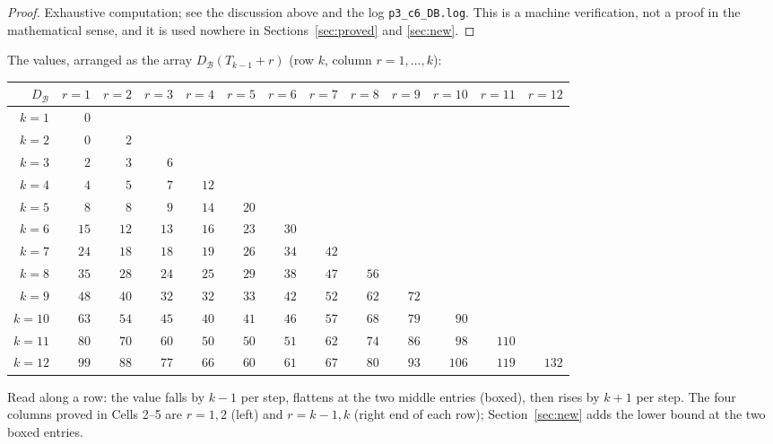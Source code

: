 \documentclass[11pt]{article}
\theoremstyle{definition}
\newcommand{\DB}{D_{\mathcal{B}}}
\begin{document}
\begin{proof}
Exhaustive computation; see the discussion above and the log \texttt{p3\_c6\_DB.log}.  This is a
machine verification, not a proof in the mathematical sense, and it is used nowhere in
Sections~\ref{sec:proved} and \ref{sec:new}.
\end{proof}

\noindent The values, arranged as the array $\DB(T_{k-1}+r)$ (row $k$, column $r=1,\dots,k$):

\begin{center}\small\setlength{\tabcolsep}{3pt}
\begin{tabular}{rrrrrrrrrrrrr}
\hline
$\DB$ & $r=1$ & $r=2$ & $r=3$ & $r=4$ & $r=5$ & $r=6$ & $r=7$ & $r=8$ & $r=9$ & $r=10$ & $r=11$ & $r=12$ \\
\hline
$k=1$ & $0$ &  &  &  &  &  &  &  &  &  &  &  \\
$k=2$ & $0$ & $2$ &  &  &  &  &  &  &  &  &  &  \\
$k=3$ & $\boxed{2}$ & $\boxed{3}$ & $6$ &  &  &  &  &  &  &  &  &  \\
$k=4$ & $\boxed{4}$ & $\boxed{5}$ & $7$ & $12$ &  &  &  &  &  &  &  &  \\
$k=5$ & $8$ & $\boxed{8}$ & $\boxed{9}$ & $14$ & $20$ &  &  &  &  &  &  &  \\
$k=6$ & $15$ & $\boxed{12}$ & $\boxed{13}$ & $16$ & $23$ & $30$ &  &  &  &  &  &  \\
$k=7$ & $24$ & $18$ & $\boxed{18}$ & $\boxed{19}$ & $26$ & $34$ & $42$ &  &  &  &  &  \\
$k=8$ & $35$ & $28$ & $\boxed{24}$ & $\boxed{25}$ & $29$ & $38$ & $47$ & $56$ &  &  &  &  \\
$k=9$ & $48$ & $40$ & $32$ & $\boxed{32}$ & $\boxed{33}$ & $42$ & $52$ & $62$ & $72$ &  &  &  \\
$k=10$ & $63$ & $54$ & $45$ & $\boxed{40}$ & $\boxed{41}$ & $46$ & $57$ & $68$ & $79$ & $90$ &  &  \\
$k=11$ & $80$ & $70$ & $60$ & $50$ & $\boxed{50}$ & $\boxed{51}$ & $62$ & $74$ & $86$ & $98$ & $110$ &  \\
$k=12$ & $99$ & $88$ & $77$ & $66$ & $\boxed{60}$ & $\boxed{61}$ & $67$ & $80$ & $93$ & $106$ & $119$ & $132$ \\
\hline
\end{tabular}
\end{center}

\noindent Read along a row: the value falls by $k-1$ per step, flattens at the two middle entries (boxed), then
rises by $k+1$ per step.  The four columns proved in Cells 2--5 are $r=1,2$ (left) and $r=k-1,k$ (right end of each
row); Section~\ref{sec:new} adds the lower bound at the two boxed entries.
\end{document}
